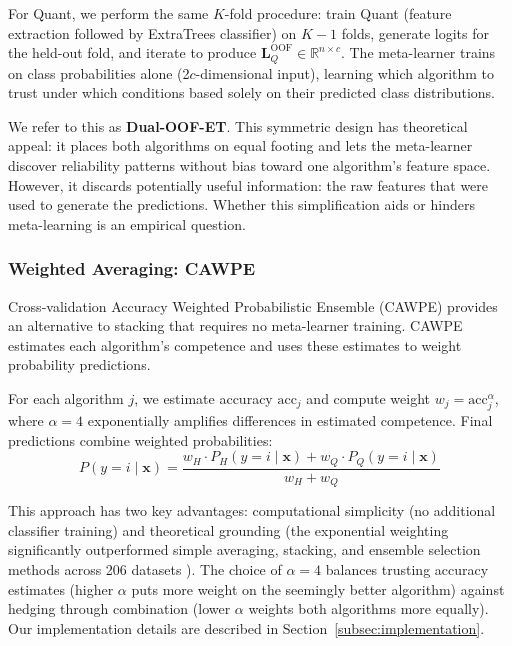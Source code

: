 \documentclass[pdflatex,sn-basic]{sn-jnl}           %
\theoremstyle{thmstyleone}%
\theoremstyle{thmstyletwo}%
\theoremstyle{thmstylethree}%
\begin{document}
For Quant, we perform the same $K$-fold procedure: train Quant (feature extraction followed by ExtraTrees classifier) on $K-1$ folds, generate logits for the held-out fold, and iterate to produce $\mathbf{L}_Q^{\text{OOF}} \in \mathbb{R}^{n \times c}$. The meta-learner trains on class probabilities alone (2$c$-dimensional input), learning which algorithm to trust under which conditions based solely on their predicted class distributions.

We refer to this as \textbf{Dual-OOF-ET}. This symmetric design has theoretical appeal: it places both algorithms on equal footing and lets the meta-learner discover reliability patterns without bias toward one algorithm's feature space. However, it discards potentially useful information: the raw features that were used to generate the predictions. Whether this simplification aids or hinders meta-learning is an empirical question.

\subsubsection{Weighted Averaging: CAWPE}

Cross-validation Accuracy Weighted Probabilistic Ensemble (CAWPE) \citep{cawpe} provides an alternative to stacking that requires no meta-learner training. CAWPE estimates each algorithm's competence and uses these estimates to weight probability predictions.

For each algorithm $j$, we estimate accuracy $\text{acc}_j$ and compute weight $w_j = \text{acc}_j^\alpha$, where $\alpha=4$ exponentially amplifies differences in estimated competence. Final predictions combine weighted probabilities:
\begin{equation}
P(y=i \mid \mathbf{x}) = \frac{w_H \cdot P_H(y=i \mid \mathbf{x}) + w_Q \cdot P_Q(y=i \mid \mathbf{x})}{w_H + w_Q}
\end{equation}

This approach has two key advantages: computational simplicity (no additional classifier training) and theoretical grounding (the exponential weighting significantly outperformed simple averaging, stacking, and ensemble selection methods across 206 datasets \citep{cawpe}). The choice of $\alpha=4$ balances trusting accuracy estimates (higher $\alpha$ puts more weight on the seemingly better algorithm) against hedging through combination (lower $\alpha$ weights both algorithms more equally). Our implementation details are described in Section~\ref{subsec:implementation}.
\end{document}
